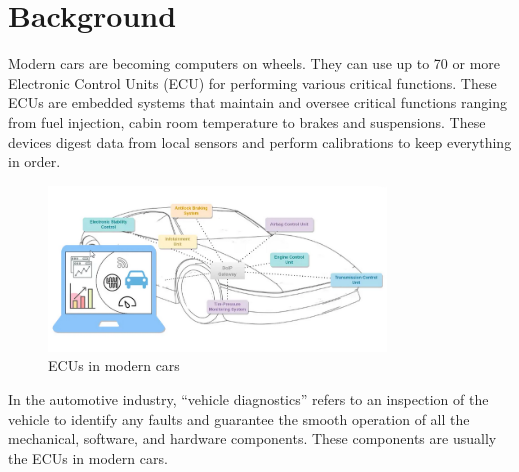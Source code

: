 %



%

\section{Background}
Modern cars are becoming computers on wheels. They can use up to 70 or more Electronic Control Units (ECU) for 
performing various critical functions. These ECUs are embedded systems that maintain and oversee critical functions 
ranging from fuel injection, cabin room temperature to brakes and suspensions. These devices digest data from local 
sensors and perform calibrations to keep everything in order.

\begin{figure}[htbp]
    \centering
    \includegraphics[width=0.8\textwidth]{./pictures/ECUs-in-modern-cars.png}
    \caption{ECUs in modern cars}
    \label{fig:2.1}
\end{figure}

In the automotive industry, “vehicle diagnostics” refers to an inspection of the vehicle to identify any faults and 
guarantee the smooth operation of all the mechanical, software, and hardware components. These components are usually 
the ECUs in modern cars.

